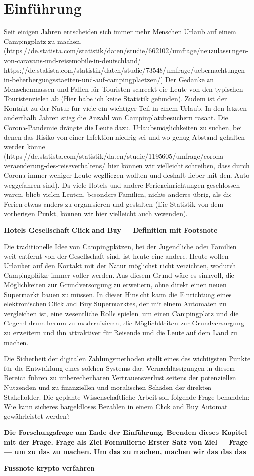 \section{Einführung}


Seit einigen Jahren entscheiden sich immer mehr Menschen Urlaub auf einem Campingplatz 
zu machen. (https://de.statista.com/statistik/daten/studie/662102/umfrage/neuzulassungen-von-caravans-und-reisemobile-in-deutschland/
https://de.statista.com/statistik/daten/studie/73548/umfrage/uebernachtungen-in-beherbergungsstaetten-und-auf-campingplaetzen/) 
Der Gedanke an Menschenmassen und Fallen für Touristen schreckt die Leute von
den typischen Touristenzielen ab (Hier habe ich keine Statistik gefunden). Zudem ist der Kontakt zu der Natur für viele ein wichtiger
Teil in einem Urlaub. In den letzten anderthalb Jahren stieg die Anzahl von Campinplatzbesuchern
rasant. Die Corona-Pandemie drängte die Leute dazu, Urlaubsmöglichkeiten zu suchen, bei denen
das Risiko von einer Infektion niedrig sei und wo genug Abstand gehalten werden könne (https://de.statista.com/statistik/daten/studie/1195605/umfrage/corona-veraenderung-des-reiseverhaltens/
 hier können wir vielleicht schreiben, dass durch Corona immer weniger Leute wegfliegen wollten und deshalb lieber mit dem Auto weggefahren sind). 
Da viele 
Hotels und andere Ferieneinrichtungen geschlossen waren, blieb vielen Leuten, besonders Familien,
nichts anderes übrig, als die Ferien etwas anders zu organisieren und gestalten (Die Statistik von dem vorherigen Punkt, können wir hier vielleicht auch vewenden).


\textbf{Hotels Gesellschaft}
\textbf{Click and Buy = Definition mit Footsnote}


Die traditionelle Idee von Campingplätzen, bei der Jugendliche oder Familien weit entfernt von der 
Gesellschaft sind, ist heute eine andere. Heute wollen Urlauber auf den Kontakt mit der Natur
möglichst nicht verzichten, wodurch Campingplätze immer voller werden. Aus diesem Grund wäre es
sinnvoll, die Möglichkeiten zur Grundversorgung zu erweitern, ohne direkt einen neuen Supermarkt
bauen zu müssen. In dieser Hinsicht kann die Einrichtung eines elektronischen Click and Buy
Supermarktes, der mit einem Automaten zu vergleichen ist, eine wesentliche Rolle spielen, um 
einen Campingplatz und die Gegend drum herum zu modernisieren, die Möglichkleiten zur Grundversorgung 
zu erweitern und ihn attraktiver für Reisende und die Leute auf dem Land zu machen.

Die Sicherheit der digitalen Zahlungsmethoden stellt eines des wichtigsten Punkte für die Entwicklung
eines solchen Systems dar. Vernachlässigungen in diesem Bereich führen zu unberechenbaren Vertrauensverlust 
seitens der potenziellen Nutzenden und zu finanziellen und moralischen Schäden der direkten
Stakeholder. Die geplante Wissenschaftliche Arbeit soll folgende Frage behandeln:
Wie kann sicheres bargeldloses Bezahlen in einem Click and Buy Automat gewährleistet werden? 

\textbf{Die Forschungsfrage am Ende der Einführung. Beenden dieses Kapitel mit der Frage.} 
\textbf{Frage als Ziel Formulierne}
\textbf{Erster Satz von Ziel = Frage --- um zu das zu machen. Um das zu machen, machen wir das das das}

\textbf{Fussnote krypto verfahren}


